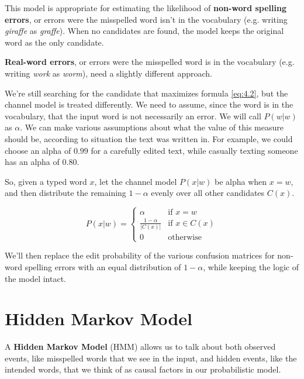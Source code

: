 This model is appropriate for estimating the likelihood of \textbf{non-word spelling errors}, or errors were the 
misspelled word isn't in the vocabulary (e.g. writing \textsl{giraffe} as \textsl{graffe}).
When no candidates are found, the model keeps the original word as the only candidate.

\textbf{Real-word errors}, or errors were the misspelled word is in the vocabulary (e.g. writing \textsl{work}  as  
\textsl{worm}), need a slightly different approach.

We're still searching for the candidate that maximizes formula \ref{eq:4.2}, but the channel model is treated 
differently. 
We need to assume, since the word is in the vocabulary, that the input word is not necessarily an error. We will call 
$P(w|w)$ as $\alpha$. We can make various assumptions about what the value of this measure should be, 
according to situation the text was written in. For example, we could choose an alpha of $0.99$ for a carefully edited 
text, while casually texting someone has an alpha of $0.80$.

So, given a typed word $x$, let the channel model $P(x|w)$ be alpha when $x = w$, and then distribute the remaining
$1-\alpha$ evenly over all other candidates $C(x)$.

\begin{equation}\label{eq:4.3}
	P(x|w) = \begin{cases} 
	\alpha & \mbox{if } x = w \\ 
	\frac{1-\alpha}{|C(x)|} & \mbox{if }  x \in C(x) \\
	0 & \mbox{otherwise} 
	\end{cases}
\end{equation}

We'll then replace the edit probability of the various confusion matrices for non-word spelling errors with an 
equal distribution of $1-\alpha$, while keeping the logic of the model intact.

\section{Hidden Markov Model}
\label{section:hmm}
A \textbf{Hidden Markov Model} (HMM) allows us to talk about both observed events, like misspelled words that 
we see in the input, and hidden events, like the intended words, that we think of as causal factors in our 
probabilistic model. 

